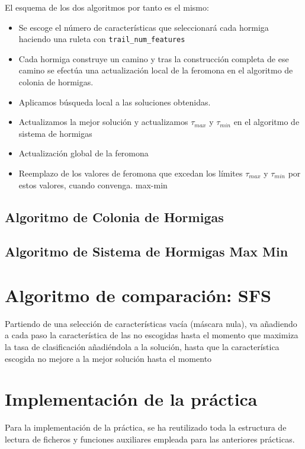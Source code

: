 \documentclass[a4paper,11pt]{article}
\begin{document}
El esquema de los dos algoritmos por tanto es el mismo:

\begin{itemize}
 \item Se escoge el número de características que seleccionará cada hormiga haciendo una ruleta con \texttt{trail\_num\_features}
 \item Cada hormiga construye un camino y tras la construcción completa de ese camino se efectúa una actualización local
 de la feromona en el algoritmo de colonia de hormigas.
 \item Aplicamos búsqueda local a las soluciones obtenidas.
 \item Actualizamos la mejor solución y actualizamos $\tau_{max}$ y $\tau_{min}$ en el algoritmo de sistema de hormigas
 \item Actualización global de la feromona
 \item Reemplazo de los valores de feromona que excedan los límites $\tau_{max}$ y $\tau_{min}$ por estos valores, cuando
 convenga.
 max-min
\end{itemize}


  \subsection{Algoritmo de Colonia de Hormigas}

  \small{\texttt{}}
  \normalsize

  \subsection{Algoritmo de Sistema de Hormigas Max Min}

  \small{\texttt{}}
  \normalsize

  
\section{Algoritmo de comparación: SFS}
\small{\texttt{}}

Partiendo de una selección de características vacía (máscara nula), va añadiendo a cada paso la característica
de las no escogidas hasta el momento que maximiza la tasa de clasificación añadiéndola a la solución, hasta
que la característica escogida no mejore a la mejor solución hasta el momento

\section{Implementación de la práctica}
Para la implementación de la práctica, se ha reutilizado toda la estructura de lectura de ficheros y funciones auxiliares
empleada para las anteriores prácticas.
\end{document}
